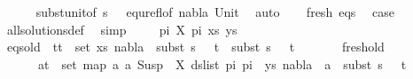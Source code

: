 \begin{isabellebody}
\ \ \ \ \isamarkupfalse%
\ subst{\isacharunderscore}{\kern0pt}unit{\isacharbrackleft}{\kern0pt}of\ {\isacartoucheopen}{\isacharparenleft}{\kern0pt}s{}\ {\isasymbullet}\ {\isacharbrackleft}{\kern0pt}{\isacharbrackright}{\kern0pt}{\isacharparenright}{\kern0pt}{\isacartoucheclose}{\isacharbrackright}{\kern0pt}\ equ{\isacharunderscore}{\kern0pt}refl{\isacharbrackleft}{\kern0pt}of\ nabla{}\ Unit{\isacharbrackright}{\kern0pt}\ \isamarkupfalse%
\ auto\isanewline
\ \ \isamarkupfalse%
\ fresh\ eqs\ \isamarkupfalse%
\ {\isacharquery}{\kern0pt}case\isanewline
\ \ \ \ \isamarkupfalse%
\ all{\isacharunderscore}{\kern0pt}solutions{\isacharunderscore}{\kern0pt}def\ \isamarkupfalse%
\ simp\isanewline
{}\isamarkupfalse%
\isanewline
\ \ \isamarkupfalse%
\ {\isacharparenleft}{\kern0pt}{}\ pi{}\ X\ pi{}\ xs\ ys{\isacharparenright}{\kern0pt}\isanewline
\ \ \isamarkupfalse%
\ eqs{\isacharunderscore}{\kern0pt}old{\isacharcolon}{\kern0pt}\ {\isachardoublequoteopen}{\isasymforall}\ {\isacharparenleft}{\kern0pt}t{}{\isacharcomma}{\kern0pt}t{}{\isacharparenright}{\kern0pt}\ {\isasymin}\ set\ xs{\isachardot}{\kern0pt}\ nabla{}\ {\isasymturnstile}\ subst\ {\isacharparenleft}{\kern0pt}s{}\ {\isasymbullet}\ {\isacharbrackleft}{\kern0pt}{\isacharbrackright}{\kern0pt}{\isacharparenright}{\kern0pt}\ t{}\ {\isasymapprox}\ subst\ {\isacharparenleft}{\kern0pt}s{}\ {\isasymbullet}\ {\isacharbrackleft}{\kern0pt}{\isacharbrackright}{\kern0pt}{\isacharparenright}{\kern0pt}\ t{}{\isachardoublequoteclose}\ \isanewline
\ \ \ \ \ \ fresh{\isacharunderscore}{\kern0pt}old{\isacharcolon}{\kern0pt}\ \isanewline
\ \ \ \ \ {\isachardoublequoteopen}{\isasymforall}\ {\isacharparenleft}{\kern0pt}a{\isacharcomma}{\kern0pt}t{\isacharparenright}{\kern0pt}\ {\isasymin}\ set\ {\isacharparenleft}{\kern0pt}map\ {\isacharparenleft}{\kern0pt}{\isasymlambda}a{\isachardot}{\kern0pt}\ {\isacharparenleft}{\kern0pt}a{\isacharcomma}{\kern0pt}\ Susp\ {\isacharbrackleft}{\kern0pt}{\isacharbrackright}{\kern0pt}\ X{\isacharparenright}{\kern0pt}{\isacharparenright}{\kern0pt}\ {\isacharparenleft}{\kern0pt}ds{\isacharunderscore}{\kern0pt}list\ pi{}\ pi{}{\isacharparenright}{\kern0pt}\ {\isacharat}{\kern0pt}\ ys{\isacharparenright}{\kern0pt}{\isachardot}{\kern0pt}\ nabla{}\ {\isasymturnstile}\ a\ {\isasymsharp}\ subst\ {\isacharparenleft}{\kern0pt}s{}\ {\isasymbullet}\ {\isacharbrackleft}{\kern0pt}{\isacharbrackright}{\kern0pt}{\isacharparenright}{\kern0pt}\ t{\isachardoublequoteclose}\isanewline

\end{isabellebody}
